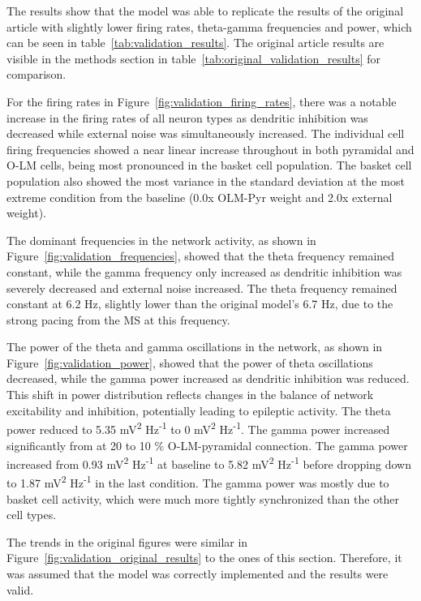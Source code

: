 The results show that the model was able to
replicate the results of the original article with slightly lower firing rates,
theta-gamma frequencies and power, which can be seen in
table~\ref{tab:validation_results}. The original article results are visible in
the methods section in table~\ref{tab:original_validation_results} for comparison.

For the firing rates in Figure~\ref{fig:validation_firing_rates},
there was a notable increase in the firing rates of all neuron types as dendritic inhibition was
decreased while external noise was simultaneously increased.
The individual cell firing frequencies showed a near linear increase throughout in both pyramidal and O-LM cells,
being most pronounced in the basket cell population.
The basket cell population also showed the most variance in the standard deviation at the most extreme
condition from the baseline (0.0x OLM-Pyr weight and 2.0x external weight).

The dominant frequencies in the network activity, as shown in Figure~\ref{fig:validation_frequencies},
showed that the theta frequency remained constant, while the gamma frequency only increased as dendritic inhibition was severely decreased and external noise increased.
The theta frequency remained constant at 6.2 Hz, slightly lower than the original model's 6.7 Hz, due to the strong pacing from the MS at this frequency.

The power of the theta and gamma oscillations in the network, as shown in Figure~\ref{fig:validation_power},
showed that the power of theta oscillations decreased, while the gamma power increased as dendritic inhibition was reduced.
This shift in power distribution reflects changes in the balance of network excitability and inhibition, potentially leading to epileptic activity.
The theta power reduced to 5.35 mV\textsuperscript{2} Hz\textsuperscript{-1} to 0 mV\textsuperscript{2} Hz\textsuperscript{-1}.
The gamma power increased significantly from at 20 to 10 \% O-LM-pyramidal connection. The gamma power increased from 0.93 mV\textsuperscript{2} Hz\textsuperscript{-1}
at baseline to 5.82 mV\textsuperscript{2} Hz\textsuperscript{-1} before dropping down to 1.87 mV\textsuperscript{2} Hz\textsuperscript{-1} in the last condition.
The gamma power was mostly due to basket cell activity, which were much more tightly synchronized than the other cell types.

The trends in the original figures were similar in Figure~\ref{fig:validation_original_results} to the ones of this section.
Therefore, it was assumed that the model was correctly implemented and the results were valid.

